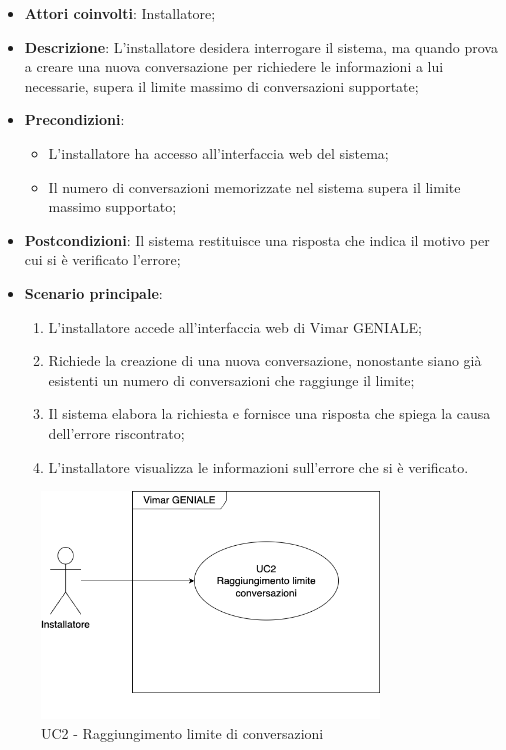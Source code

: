 \begin{itemize}
    \item \textbf{Attori coinvolti}: Installatore;
    \item \textbf{Descrizione}: L’installatore desidera interrogare il sistema, ma quando prova a creare una nuova conversazione per richiedere le informazioni a lui necessarie, supera il limite massimo di conversazioni supportate;
    \item \textbf{Precondizioni}: 
        \begin{itemize}
            \item L’installatore ha accesso all’interfaccia web del sistema;
            \item Il numero di conversazioni memorizzate nel sistema supera il limite massimo supportato;
        \end{itemize}
    \item \textbf{Postcondizioni}:  Il sistema restituisce una risposta che indica il motivo per cui si è verificato l’errore;
    \item \textbf{Scenario principale}:
    \begin{enumerate}
    \item L’installatore accede all’interfaccia web di Vimar GENIALE;
    \item Richiede la creazione di una nuova conversazione, nonostante siano già esistenti un numero di conversazioni che raggiunge il limite;
    \item Il sistema elabora la richiesta e fornisce una risposta che spiega la causa dell'errore riscontrato;
    \item L’installatore visualizza le informazioni sull’errore che si è verificato.
    \end{enumerate}
\end{itemize}
\begin{figure}[H]
\centering
\includegraphics[width=0.8\textwidth]{contents/casi_duso/png/UC2.png}
\caption{UC2 - Raggiungimento limite di conversazioni}
\end{figure}


